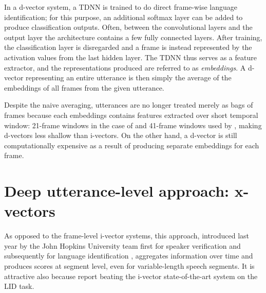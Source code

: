 \documentclass[bsc,frontabs,twoside,singlespacing,parskip,deptreport]{infthesis}
\begin{document}
{{    %
    In a d-vector system, a TDNN is trained to do direct frame-wise language identification; for this purpose, an additional softmax layer can be added to produce classification outputs. Often, between the convolutional layers and the output layer the architecture contains a few fully connected layers. After training, the classification layer is disregarded and a frame is instead represented by the activation values from the last hidden layer. The TDNN thus serves as a feature extractor, and the representations produced are referred to as \textit{embeddings}.
    A d-vector representing an entire utterance is then simply the average of the embeddings of all frames from the given utterance.
    
    Despite the naive averaging, utterances are no longer treated merely as bags of frames because each embeddings contains features extracted over short temporal window: 21-frame windows in the case of \citeauthor{dvectors_lid} and 41-frame windows used by \citeauthor{Variani_et_al_2014}, making d-vectors less shallow than i-vectors. On the other hand, a d-vector is still computationally expensive as a result of producing separate embeddings for each frame.
  }

  \section{Deep utterance-level approach: x-vectors}{
    \label{sec:x-vectors}
    As opposed to the frame-level i-vector systems, this approach, introduced last year by the John Hopkins University team first for speaker verification \citep{Snyder_et_al_2018b} and subsequently for language identification \citep{Snyder_et_al_2018}, aggregates information over time and produces scores at segment level, even for variable-length speech segments. It is attractive also because \citeauthor{Snyder_et_al_2018} report beating the i-vector state-of-the-art system on the LID task.

}}
\end{document}
